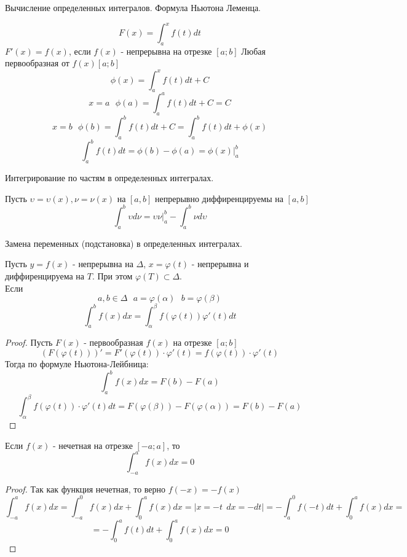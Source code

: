 \begin{title}[\Large]
  Вычисление определенных интегралов. Формула Ньютона Леменца.
\end{title}

\[F(x) = \int^x_a f(t)dt\]
$F'(x) = f(x)$, если $f(x)$ - непрерывна на отрезке $[a; b]$ Любая первообразная
от $f(x) [a; b]$
\[\phi (x) = \int^x_a f(t)dt + C\]
\[x = a ~~~ \phi (a) = \int^a_a f(t)dt + C = C\]
\[x = b ~~~ \phi (b) = \int^b_a f(t)dt + C = \int^b_a f(t)dt + \phi(x)\]
\[\int^b_a f(t)dt = \phi(b) - \phi(a) = \phi(x)|^b_a\]

\begin{title}[\Large]
  Интегрирование по частям в определенных интегралах.
\end{title}

\begin{theorem}
  Пусть $\upsilon = \upsilon (x), \nu = \nu(x)$ на $[a,b]$ непрерывно
  диффиренцируемы на $[a,b]$
  \[
    \int_a^b \upsilon d\nu = \upsilon \nu |_a^b - \int_a^b \nu d\upsilon
  \]
\end{theorem}

\begin{title}[\Large]
  Замена переменных (подстановка) в определенных интегралах.
\end{title}

\begin{theorem}
  Пусть $y = f(x)$ - непрерывна на $\Delta$, $x = \varphi (t)$ - непрерывна и
  диффиренцируема на $T$. При этом $\varphi (T) \subset \Delta$.\\
  Если
  \[a, b \in \Delta ~~~ a = \varphi (\alpha) ~~~ b = \varphi (\beta)\]
  \[\int^b_a f(x)dx = \int^{\beta}_{\alpha} f(\varphi (t)) \varphi' (t)dt\]
\end{theorem}

\begin{proof}
  Пусть $F(x)$ - первообразная $f(x)$ на отрезке $[a; b]$\\
  \[
    (F(\varphi (t)))' = F'(\varphi (t)) \cdot \varphi' (t) = f(\varphi(t))
    \cdot \varphi'(t)
  \]
  Тогда по формуле Ньютона-Лейбница:
  \[\int^b_a f(x)dx = F(b) - F(a)\]
  \[
    \int^{\beta}_{\alpha} f(\varphi (t)) \cdot \varphi' (t)dt =
    F(\varphi (\beta)) - F(\varphi (\alpha)) = F(b) - F(a)
  \]
\end{proof}

\begin{theorem}
  Если $f(x)$ - нечетная на отрезке $[-a; a]$, то
  \[\int^a_{-a} f(x)dx = 0\]
\end{theorem}

\begin{proof}
  Так как функция нечетная, то верно $f(-x) = -f(x)$
  \[\int^a_{-a} f(x)dx = \int^0_{-a} f(x)dx + \int^a_0 f(x)dx =
    |x = -t ~~ dx = -dt| = -\int^0_a f(-t)dt + \int^a_0 f(x)dx =\]
    \[= -\int^a_0 f(t)dt + \int^a_0 f(x)dx = 0\]
\end{proof}